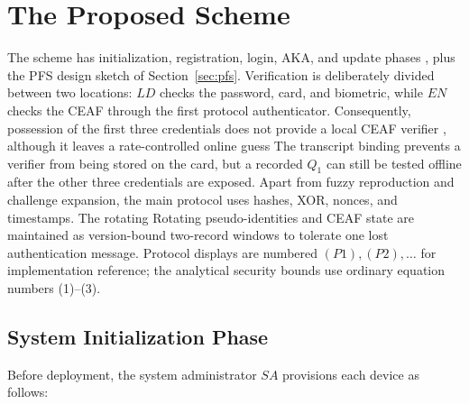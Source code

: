 \documentclass[cmc,article,submit,moreauthors,pdftex]{Definitions/tsp}
\providecommand{\DIFadd}[1]{{\protect\color{blue} \sf #1}} %
\providecommand{\DIFdel}[1]{{\protect\color{red} \scriptsize #1}} %
\providecommand{\DIFaddbegin}{} %
\providecommand{\DIFaddend}{} %
\providecommand{\DIFdelbegin}{} %
\providecommand{\DIFdelend}{} %
\begin{document}
\section{The Proposed Scheme}\label{sec:scheme}

The scheme has initialization, registration, login, AKA, and update phases\DIFdelbegin \DIFdel{, plus the PFS design sketch of Section~\ref{sec:pfs}}\DIFdelend . Verification is \DIFdelbegin \DIFdel{deliberately }\DIFdelend divided between two locations: $LD$ checks the password, card, and biometric, while $EN$ checks \DIFdelbegin \DIFdel{the }\DIFdelend CEAF through the first protocol authenticator. \DIFdelbegin \DIFdel{Consequently, possession of the first three credentials does not provide a local CEAF verifier , although it leaves a rate-controlled online guess}\DIFdelend \DIFaddbegin \DIFadd{The transcript binding prevents a verifier from being stored on the card, but a recorded $Q_1$ can still be tested offline after the other three credentials are exposed}\DIFaddend . Apart from fuzzy reproduction and challenge expansion, the \DIFdelbegin \DIFdel{main }\DIFdelend protocol uses hashes, XOR, nonces, and timestamps. \DIFdelbegin \DIFdel{The rotating }\DIFdelend \DIFaddbegin \DIFadd{Rotating }\DIFaddend pseudo-identities and CEAF state are maintained as version-bound two-record windows to tolerate one lost authentication message. \DIFaddbegin \DIFadd{Protocol displays are numbered $(P1),(P2),\ldots$ for implementation reference; the analytical security bounds use ordinary equation numbers (1)--(3).
}\DIFaddend 

\subsection{System Initialization Phase}

Before deployment, the system administrator $SA$ provisions each device as follows:
\end{document}
